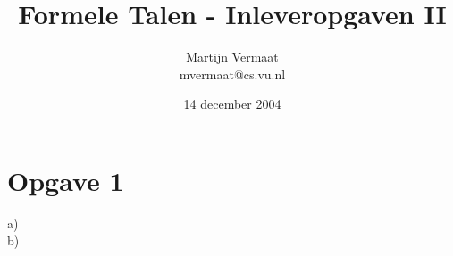 \documentclass[a4paper,11pt]{article}
\title{Formele Talen - Inleveropgaven II}
\author{
    Martijn Vermaat\\
    mvermaat@cs.vu.nl
}
\date{14 december 2004}
\begin{document}
\maketitle


\section*{Opgave 1}


\begin{description}


\item[a)]


\item[b)]


%


\end{description}
\end{document}
